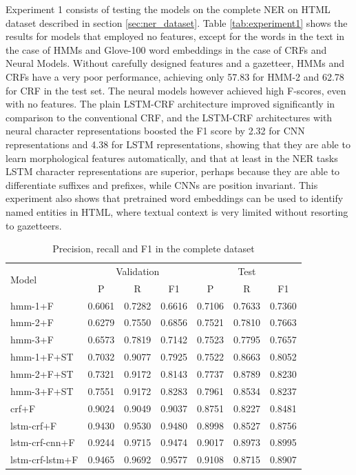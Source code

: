 \documentclass[sigconf]{acmart}
\begin{document}
Experiment 1 consists of testing the models on the complete NER on HTML dataset 
described in section \ref{sec:ner_dataset}. Table \ref{tab:experiment1} shows the 
results for models that employed no features, except for the words in the text
in the case of HMMs and Glove-100 word embeddings in the case of CRFs and Neural Models.
Without carefully designed features and a gazetteer, HMMs and CRFs have a very 
poor performance, achieving only 57.83 for HMM-2 and 62.78 for CRF in the test set. 
The neural models however achieved high F-scores, even with no features. The
plain LSTM-CRF architecture improved significantly in comparison to the conventional CRF,
and the LSTM-CRF architectures with neural character representations boosted the F1 score
by 2.32 for CNN representations and 4.38 for LSTM representations, showing that they are 
able to learn morphological features automatically, and that at least in the NER tasks LSTM 
character representations are superior, perhaps because they are able to differentiate 
suffixes and prefixes, while CNNs are position invariant. This experiment also shows that
pretrained word embeddings can be used to identify named entities in HTML, where
textual context is very limited without resorting to gazetteers.

\begin{table}[h]
  \small
  \begin{center}
    \begin{tabular}{ lllllll }
      \toprule
      \multirow{2}{*}{Model} & \multicolumn{3}{c}{Validation} & \multicolumn{3}{c}{Test} \\
                             & \multicolumn{1}{c}{P} & \multicolumn{1}{c}{R} & \multicolumn{1}{c}{F1}
                             & \multicolumn{1}{c}{P} & \multicolumn{1}{c}{R} & \multicolumn{1}{c}{F1} \\
      \midrule
      hmm-1+F	      & 0.6061 & 0.7282 & 0.6616 & 0.7106 & 0.7633 & 0.7360 \\
      hmm-2+F	      & 0.6279 & 0.7550 & 0.6856 & 0.7521 & 0.7810 & 0.7663 \\
      hmm-3+F	      & 0.6573 & 0.7819 & 0.7142 & 0.7523 & 0.7795 & 0.7657 \\
      hmm-1+F+ST      & 0.7032 & 0.9077 & 0.7925 & 0.7522 & 0.8663 & 0.8052 \\
      hmm-2+F+ST      & 0.7321 & 0.9172 & 0.8143 & 0.7737 & 0.8789 & 0.8230 \\
      hmm-3+F+ST      & 0.7551 & 0.9172 & 0.8283 & 0.7961 & 0.8534 & 0.8237 \\
      crf+F	      & 0.9024 & 0.9049 & 0.9037 & 0.8751 & 0.8227 & 0.8481 \\
      lstm-crf+F      & 0.9430 & 0.9530 & 0.9480 & 0.8998 & 0.8527 & 0.8756 \\
      lstm-crf-cnn+F  & 0.9244 & 0.9715 & 0.9474 & 0.9017 & 0.8973 & 0.8995 \\
      lstm-crf-lstm+F & 0.9465 & 0.9692 & 0.9577 & 0.9108 & 0.8715 & 0.8907 \\
      \bottomrule
    \end{tabular}
  \end{center}
  \caption{Precision, recall and F1 in the complete dataset}
  \label{tab:experiment1f}
\end{table}
\end{document}
